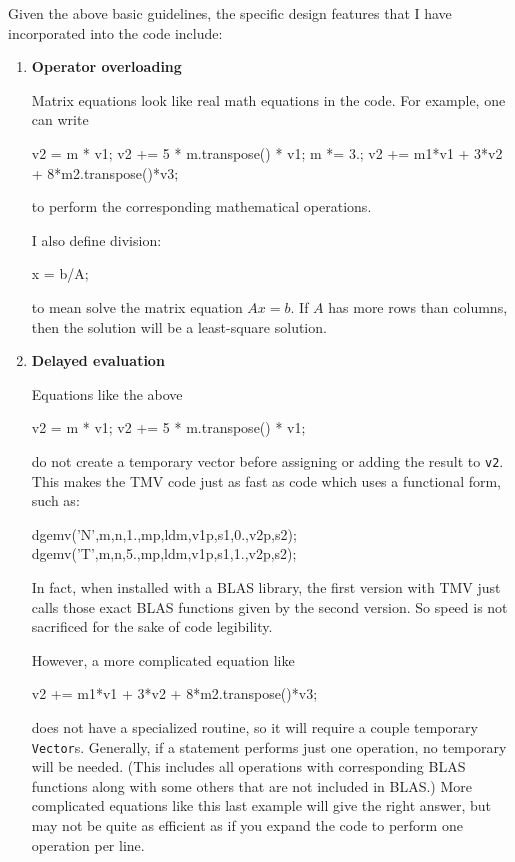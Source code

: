 \documentclass[twoside,letterpaper,11pt]{article}
\renewcommand{\tt}[1]{{\lstinline {#1}}}
\begin{document}
Given the above basic guidelines, the specific design features that I 
have incorporated into the code include:

\begin{enumerate}
\item
\textbf{Operator overloading}

Matrix equations look like real math equations in the code. 
For example, one can write 
\begin{tmvcode}
v2 = m * v1;
v2 += 5 * m.transpose() * v1;
m *= 3.;
v2 += m1*v1 + 3*v2 + 8*m2.transpose()*v3;
\end{tmvcode}
to perform the corresponding mathematical operations.

I also define division:
\begin{tmvcode}
x = b/A;
\end{tmvcode}
to mean solve the matrix equation $A x = b$.  If $A$ has more rows than columns,
then the solution will be a least-square solution.

\item
\textbf{Delayed evaluation}

Equations like the above 
\begin{tmvcode}
v2 = m * v1;
v2 += 5 * m.transpose() * v1;
\end{tmvcode}
do not create a temporary vector before assigning or adding the result to \tt{v2}.  This makes 
the TMV code just as fast as code which uses a functional form, such as:
\begin{tmvcode}
dgemv('N',m,n,1.,mp,ldm,v1p,s1,0.,v2p,s2);
dgemv('T',m,n,5.,mp,ldm,v1p,s1,1.,v2p,s2);
\end{tmvcode}
In fact, when installed with a BLAS library, the first version with TMV just calls those exact 
BLAS functions given by the second version.  
So speed is not sacrificed for the sake of code legibility.

However, a more complicated equation like
\begin{tmvcode}
v2 += m1*v1 + 3*v2 + 8*m2.transpose()*v3;
\end{tmvcode}
does not have a specialized routine, 
so it will require a couple temporary \tt{Vector}s.
Generally, if a statement performs just one operation, no temporary will be needed.  
(This includes all operations with corresponding BLAS functions along with some others
that are not included in BLAS.)
More complicated equations like this last example will give the right answer, 
but may not be quite as efficient as if you expand
the code to perform one operation per line.


\end{enumerate}
\end{document}
